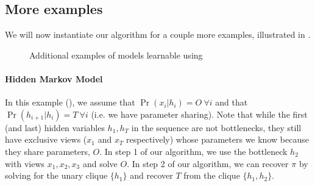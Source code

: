\subsection{More examples}

We will now instantiate our algorithm for a couple more examples, illustrated in .

\begin{figure}
  \centering
  \caption{Additional examples of models learnable using \LearnMarginals}
  \label{fig:examples}
\end{figure}

\paragraph{Hidden Markov Model}

In this example (), we assume that
  $\Pr(x_i|h_i) = O  ~\forall i$  and that $\Pr(h_{i+1} | h_i)
  = T ~\forall i$ (i.e. we have parameter sharing).
Note that while the first (and last) hidden variables $h_1, h_T$ in the
  sequence are not bottlenecks, they still have exclusive views ($x_1$ and
  $x_T$ respectively) whose parameters we know because they share
  parameters, $O$.
In step 1 of our algorithm, we use the bottleneck $h_2$ with views $x_1,
  x_2, x_3$ and solve $O$.
In step 2 of our algorithm, we can recover $\pi$ by solving for the
  unary clique $\{h_1\}$ and recover $T$ from the clique $\{h_{1},
  h_{2}\}$.

